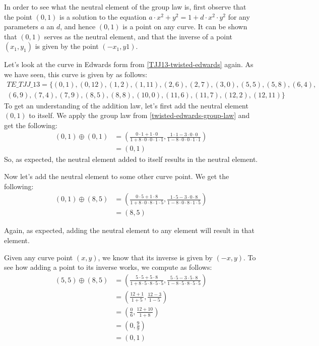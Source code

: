 In order to see what the neutral element of the group law is, first observe that the point $(0,1)$ is a solution to the  equation $a\cdot x^{2} + y^2 =1+ d\cdot x^{2}\cdot y^2$ for any parameters $a$ an $d$, and hence $(0,1)$ is a point on any  curve. It can be shown that $(0,1)$ serves as the neutral element, and that the inverse of a point $(x_1, y_1)$ is given by the point $(-x_1, y1)$.
\begin{example}
\label{example:TETJJ13}
 Let's look at the  curve in Edwards form from \eqref{TJJ13-twisted-edwards} again. As we have seen, this curve is given by as follows:
\begin{multline}
\mathit{TE\_TJJ\_13} = \{(0, 1),(0, 12),(1, 2),(1, 11),(2, 6),(2, 7),(3, 0),(5, 5),(5, 8),(6, 4),\\
(6, 9),(7, 4),(7, 9),(8, 5),(8, 8),(10, 0),(11, 6),(11, 7),(12, 2),(12, 11)\}
\end{multline}
To get an understanding of the  addition law, let's first add the neutral element $(0,1)$ to itself. We apply the group law from \eqref{twisted-edwards-group-law} and get the following:
\begin{align*}
(0, 1) \oplus (0, 1) &= \left(\frac{0\cdot 1+1 \cdot 0}{1 +8\cdot0\cdot 0\cdot 1\cdot 1},\frac{1\cdot 1-3\cdot 0\cdot 0}{1-8\cdot 0\cdot 0\cdot 1\cdot 1}\right)\\
                     & = (0,1)
\end{align*}
So, as expected, the neutral element added to itself results in the neutral element. 

Now let's add the neutral element to some other curve point. We get the following:
\begin{align*}
(0, 1) \oplus (8, 5) &= \left(\frac{0\cdot 5+1 \cdot 8}{1 +8\cdot0\cdot 8\cdot 1\cdot 5},\frac{1\cdot 5 - 3\cdot 0\cdot 8}{1-8\cdot 0\cdot 8\cdot 1\cdot 5}\right)\\
                     & = (8,5)
\end{align*}

Again, as expected, adding the neutral element to any element will result in that element. 

Given any curve point $(x,y)$, we know that its inverse is given by $(-x,y)$. To see how adding  a point to its inverse works, we compute as follows:
\begin{align*}
(5, 5) \oplus (8, 5) &= \left(\frac{5\cdot 5+5 \cdot 8}{1 +8\cdot 5\cdot 8\cdot 5\cdot 5},\frac{5\cdot 5 - 3\cdot 5\cdot 8}{1-8\cdot 5\cdot 8\cdot 5\cdot 5}\right)\\
                     &= \left(\frac{12+1}{1 +5},\frac{12 - 3}{1-5}\right)\\
                     &= \left(\frac{0}{6},\frac{12 + 10}{1+8}\right)\\
                     &= \left(0,\frac{9}{9}\right)\\
                     &=  (0,1)
\end{align*}


\end{example}
